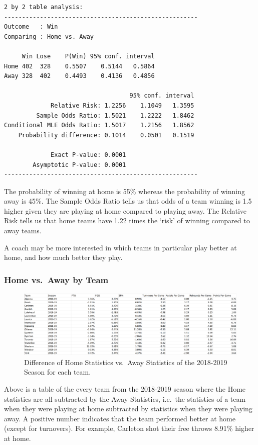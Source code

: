 \documentclass[]{book}
\begin{document}
\begin{verbatim}
2 by 2 table analysis: 
------------------------------------------------------ 
Outcome   : Win 
Comparing : Home vs. Away 

     Win Lose    P(Win) 95% conf. interval
Home 402  328    0.5507    0.5144   0.5864
Away 328  402    0.4493    0.4136   0.4856

                                   95% conf. interval
             Relative Risk: 1.2256    1.1049   1.3595
         Sample Odds Ratio: 1.5021    1.2222   1.8462
Conditional MLE Odds Ratio: 1.5017    1.2156   1.8562
    Probability difference: 0.1014    0.0501   0.1519

             Exact P-value: 0.0001 
        Asymptotic P-value: 0.0001 
------------------------------------------------------
\end{verbatim}

The probability of winning at home is 55\% whereas the probability of winning away is 45\%. The Sample Odds Ratio tells us that odds of a team winning is 1.5 higher given they are playing at home compared to playing away. The Relative Risk tells us that home teams have 1.22 times the `risk' of winning compared to away teams.

A coach may be more interested in which teams in particular play better at home, and how much better they play.

\hypertarget{home-vs.-away-by-team}{%
\subsubsection{Home vs.~Away by Team}\label{home-vs.-away-by-team}}

\begin{figure}
\centering
\includegraphics{images/HomeCourt.png}
\caption{Difference of Home Statistics vs.~Away Statistics of the 2018-2019 Season for each team.}
\end{figure}

Above is a table of the every team from the 2018-2019 season where the Home statistics are all subtracted by the
Away Statistics, i.e.~the statistics of a team when they were playing at home subtracted by statistics when they were playing away. A positive number indicates that the team performed better at home (except for turnovers). For example, Carleton shot their free throws 8.91\% higher at home.
\end{document}
